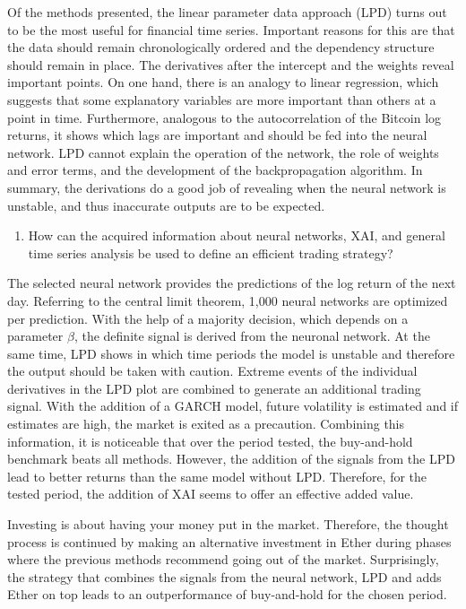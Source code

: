 \documentclass[
]{article}
\providecommand{\tightlist}{%
  \setlength{\itemsep}{0pt}\setlength{\parskip}{0pt}}
\begin{document}
Of the methods presented, the linear parameter data approach (LPD) turns
out to be the most useful for financial time series. Important reasons
for this are that the data should remain chronologically ordered and the
dependency structure should remain in place. The derivatives after the
intercept and the weights reveal important points. On one hand, there is
an analogy to linear regression, which suggests that some explanatory
variables are more important than others at a point in time.
Furthermore, analogous to the autocorrelation of the Bitcoin log
returns, it shows which lags are important and should be fed into the
neural network. LPD cannot explain the operation of the network, the
role of weights and error terms, and the development of the
backpropagation algorithm. In summary, the derivations do a good job of
revealing when the neural network is unstable, and thus inaccurate
outputs are to be expected.

\begin{enumerate}
\def\labelenumi{\arabic{enumi})}
\setcounter{enumi}{2}
\tightlist
\item
  How can the acquired information about neural networks, XAI, and
  general time series analysis be used to define an efficient trading
  strategy?
\end{enumerate}

The selected neural network provides the predictions of the log return
of the next day. Referring to the central limit theorem, 1,000 neural
networks are optimized per prediction. With the help of a majority
decision, which depends on a parameter \(\beta\), the definite signal is
derived from the neuronal network. At the same time, LPD shows in which
time periods the model is unstable and therefore the output should be
taken with caution. Extreme events of the individual derivatives in the
LPD plot are combined to generate an additional trading signal. With the
addition of a GARCH model, future volatility is estimated and if
estimates are high, the market is exited as a precaution. Combining this
information, it is noticeable that over the period tested, the
buy-and-hold benchmark beats all methods. However, the addition of the
signals from the LPD lead to better returns than the same model without
LPD. Therefore, for the tested period, the addition of XAI seems to
offer an effective added value.

Investing is about having your money put in the market. Therefore, the
thought process is continued by making an alternative investment in
Ether during phases where the previous methods recommend going out of
the market. Surprisingly, the strategy that combines the signals from
the neural network, LPD and adds Ether on top leads to an outperformance
of buy-and-hold for the chosen period.
\end{document}
